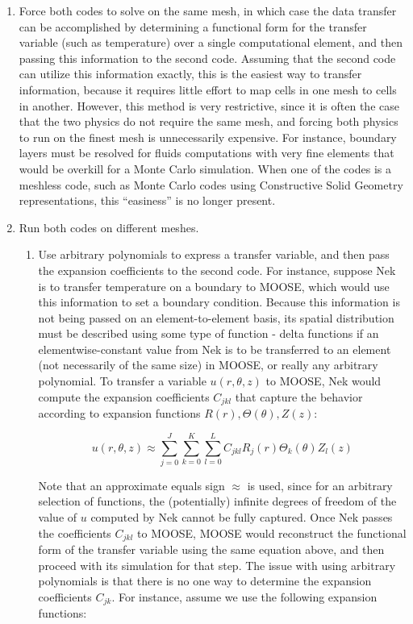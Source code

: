 \documentclass[10pt]{article}
\newcommand{\beq}{\begin{equation}}
\newcommand{\eeq}{\end{equation}}
\numberwithin{equation}{section} %
\begin{document}
\begin{enumerate}
\item Force both codes to solve on the same mesh, in which case the data transfer can be accomplished by determining a functional form for the transfer variable (such as temperature) over a single computational element, and then passing this information to the second code. Assuming that the second code can utilize this information exactly, this is the easiest way to transfer information, because it requires little effort to map cells in one mesh to cells in another. However, this method is very restrictive, since it is often the case that the two physics do not require the same mesh, and forcing both physics to run on the finest mesh is unnecessarily expensive. For instance, boundary layers must be resolved for fluids computations with very fine elements that would be overkill for a Monte Carlo simulation. When one of the codes is a meshless code, such as Monte Carlo codes using Constructive Solid Geometry representations, this ``easiness'' is no longer present.
\item Run both codes on different meshes.

	\begin{enumerate}
	\item Use arbitrary polynomials to express a transfer variable, and then pass the expansion coefficients to the second code. For instance, suppose Nek is to transfer temperature on a boundary to MOOSE, which would use this information to set a boundary condition. Because this information is not being passed on an element-to-element basis, its spatial distribution must be described using some type of function - delta functions if an elementwise-constant value from Nek is to be transferred to an element (not necessarily of the same size) in MOOSE, or really any arbitrary polynomial. To transfer a variable \(u(r, \theta, z)\) to MOOSE, Nek would compute the expansion coefficients \(C_{jkl}\) that capture the behavior according to expansion functions \(R(r), \Theta(\theta), Z(z)\):
	
	\beq
	\label{eq:GenericExpansion}
	u(r, \theta, z)\approx\sum_{j=0}^J\sum_{k=0}^K\sum_{l=0}^L C_{jkl}R_j(r)\Theta_k(\theta)Z_l(z)
	\eeq
	
Note that an approximate equals sign \(\approx\) is used, since for an arbitrary selection of functions, the (potentially) infinite degrees of freedom of the value of \(u\) computed by Nek cannot be fully captured. Once Nek passes the coefficients \(C_{jkl}\) to MOOSE, MOOSE would reconstruct the functional form of the transfer variable using the same equation above, and then proceed with its simulation for that step. The issue with using arbitrary polynomials is that there is no one way to determine the expansion coefficients \(C_{jk}\). For instance, assume we use the following expansion functions:


\end{enumerate}
\end{enumerate}
\end{document}
